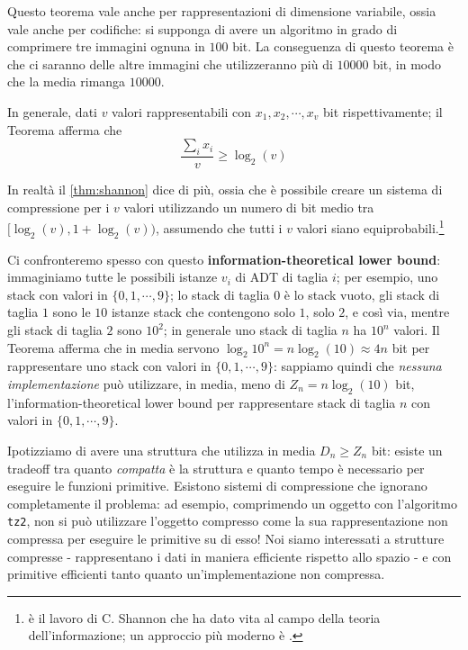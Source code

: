 Questo teorema vale anche per rappresentazioni di dimensione
variabile, ossia vale anche per codifiche: si supponga di avere un
algoritmo in grado di comprimere tre immagini ognuna in $100$ bit.
La conseguenza di questo teorema è che ci saranno delle altre immagini che
utilizzeranno più di $10000$ bit, in modo che la media rimanga $10000$.

In generale, dati $v$ valori rappresentabili con $x_1, x_2, \cdots, x_v$ bit
rispettivamente; il Teorema afferma che
$$
	\frac{\sum_{i} x_i}{v} \geq \log_2(v)
$$

In realtà il \cref{thm:shannon} dice di più, ossia che è possibile creare un
sistema di compressione per i $v$ valori utilizzando un numero di bit medio
tra $[\log_2(v), 1 + \log_2(v))$, assumendo che tutti i $v$ valori siano
equiprobabili.\footnote{
	\cite{Shannon:48:theorycommu} è il lavoro di C. Shannon che ha dato vita al campo della
	teoria dell'informazione; un approccio più moderno è \cite{Cover:06:informtheory}.}

Ci confronteremo spesso con questo \textbf{information-theoretical lower bound}:
immaginiamo tutte le possibili istanze $v_i$ di ADT di taglia $i$;
per esempio, uno stack con valori in $\{0, 1, \cdots, 9\}$;
lo stack di taglia $0$ è lo stack vuoto, gli stack
di taglia $1$ sono le $10$ istanze stack che contengono solo $1$, solo $2$, e così via,
mentre gli stack di taglia $2$ sono $10^2$; in generale uno stack
di taglia $n$ ha $10^n$ valori. Il Teorema afferma che in media servono
$\log_2{10^n} = n \log_2(10) \approx 4n$ bit per rappresentare uno stack
con valori in $\{0, 1, \cdots, 9\}$: sappiamo quindi che
\textit{nessuna implementazione} può utilizzare, in media, meno di
$Z_n =n \log_2(10)$ bit, l'information-theoretical lower bound per
rappresentare stack di taglia $n$ con valori in $\{0, 1, \cdots, 9\}$.

Ipotizziamo di avere una struttura che utilizza in media $D_n \geq Z_n$ bit:
esiste un tradeoff tra quanto \textit{compatta} è la struttura e quanto
tempo è necessario per eseguire le funzioni primitive.
Esistono sistemi di compressione che ignorano completamente il problema:
ad esempio, comprimendo un oggetto con l'algoritmo \texttt{tz2}, non si può
utilizzare l'oggetto compresso come la sua rappresentazione non compressa
per eseguire le primitive su di esso! Noi siamo interessati a strutture
compresse - rappresentano i dati in maniera efficiente rispetto allo spazio -
e con primitive efficienti tanto quanto un'implementazione non compressa.

